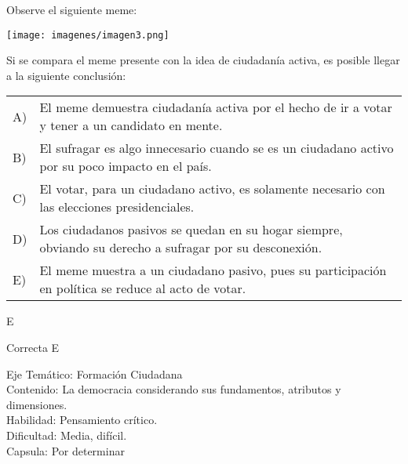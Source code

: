 \documentclass[letterpaper,11pt]{article}
\newcommand{\anchopregunta}{0.9\textwidth}
\begin{document}
\begin{enumerate}
\begin{minipage}{\anchopregunta}
\item Observe el siguiente meme:
\begin{center}
    \texttt{[image: imagenes/imagen3.png]}
\end{center}
Si se compara el meme presente con la idea de ciudadanía activa, es posible llegar a la siguiente conclusión:
\begin{flushleft}\begin{tabular}{@{\hspace{-.001\textwidth}}l@{\hspace{2pt}}p{}}
A)& El meme demuestra ciudadanía activa por el hecho de ir a votar y tener a un candidato en mente.\\
B)& El sufragar es algo innecesario cuando se es un ciudadano activo por su poco impacto en el país.\\
C)& El votar, para un ciudadano activo, es solamente necesario con las elecciones presidenciales.\\
D)& Los ciudadanos pasivos se quedan en su hogar siempre, obviando su derecho a sufragar por su desconexión.\\
E)& El meme muestra a un ciudadano pasivo, pues su participación en política se reduce al acto de votar.\\ 
\end{tabular}\end{flushleft}%
\begin{key} E
\end{key} 
\begin{hint}
\end{hint}
\begin{answer} Correcta E \\
\end{answer}
\begin{info} %
\begin{flushleft}
Eje Temático: Formación Ciudadana\\
Contenido: La democracia considerando sus fundamentos, atributos y dimensiones.\\
Habilidad: Pensamiento crítico.\\
Dificultad: Media, difícil.\\
Capsula: Por determinar \\
\end{flushleft} 
\end{info}
\end{minipage}\vfill$\;$ %


\end{enumerate}
\end{document}
